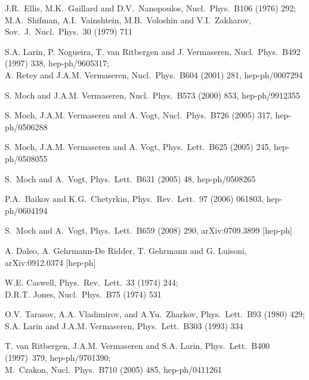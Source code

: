\documentclass[12pt]{article}
\begin{document}
{\begin{thebibliography}{10}
J.R.~Ellis, M.K.~Gaillard and D.V.~Nanopoulos,
  Nucl.\ Phys.\  B106 (1976) 292; \\
M.A.~Shifman, A.I.~Vainshtein, M.B.~Voloshin and V.I.~Zakharov,
  Sov.\ J.\ Nucl.\ Phys.\ 30 (1979) 711

S.A. Larin, P. Nogueira, T. van Ritbergen and J. Vermaseren,
  Nucl.\ Phys.\ B492 (1997) 338, hep-ph/9605317; \\
A. Retey and J.A.M. Vermaseren,
  Nucl.\ Phys.\ B604 (2001) 281, hep-ph/0007294

S. Moch and J.A.M. Vermaseren,
  Nucl.\ Phys.\ B573 (2000) 853, hep-ph/9912355

S. Moch, J.A.M. Vermaseren and A. Vogt,
  Nucl.\ Phys.\ B726 (2005) 317, hep-ph/0506288

S. Moch, J.A.M. Vermaseren and A. Vogt,
  Phys.\ Lett.\ B625 (2005) 245, hep-ph/0508055

S.~Moch and A.~Vogt,
  Phys.\ Lett.\  B631 (2005) 48, hep-ph/0508265

P.A.~Baikov and K.G.~Chetyrkin,
  Phys.\ Rev.\ Lett.\ 97 (2006) 061803, hep-ph/0604194

S.~Moch and A.~Vogt,
  Phys.\ Lett.\  B659 (2008) 290, arXiv:0709.3899 [hep-ph]

A. Daleo, A. Gehrmann-De Ridder, T. Gehrmann and G. Luisoni,
  arXiv:0912.0374 [hep-ph]

W.E. Caswell, Phys.\ Rev.\ Lett.\ 33 (1974) 244; \\
D.R.T. Jones, Nucl.\ Phys.\ B75 (1974) 531

  O.V. Tarasov, A.A. Vladimirov, and A.Yu.\ Zharkov,
                 Phys.\ Lett.\ B93 (1980) 429; \\
                 S.A. Larin and J.A.M. Vermaseren, Phys.\ Lett.\ B303
                 (1993) 334

  T. van Ritbergen, J.A.M. Vermaseren and S.A. Larin,
                 Phys.\ Lett.\ B400 (1997)~379, hep-ph/9701390; \\
                 M.~Czakon, Nucl.\ Phys.\ B710 (2005) 485, hep-ph/0411261


\end{thebibliography}}
\end{document}
